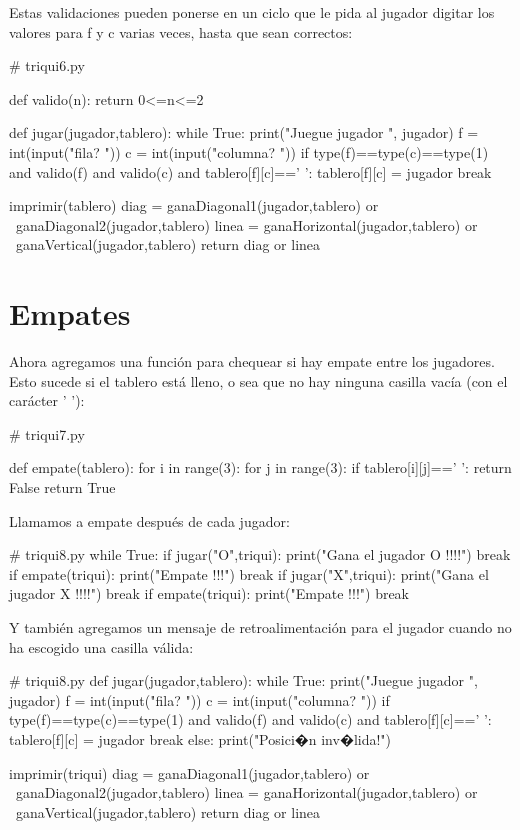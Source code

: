 Estas validaciones pueden ponerse en un ciclo que le pida al jugador
digitar los valores para f y c varias veces, hasta que sean correctos:

\begin{pythoncode}
# triqui6.py

def valido(n):
    return 0<=n<=2
    
def jugar(jugador,tablero):
    while True:     
        print("Juegue jugador ", jugador)
        f = int(input("fila? "))
        c = int(input("columna? "))
        if type(f)==type(c)==type(1) and valido(f) 
           and valido(c) and tablero[f][c]==' ':
            tablero[f][c] = jugador
            break      

    imprimir(tablero)
    diag = ganaDiagonal1(jugador,tablero) or \
           ganaDiagonal2(jugador,tablero)
    linea = ganaHorizontal(jugador,tablero) or \
            ganaVertical(jugador,tablero)
    return  diag or linea
\end{pythoncode}

\section{Empates}

Ahora agregamos una función para chequear si hay empate entre los
jugadores. Esto sucede si el tablero está lleno, o sea que no hay
ninguna casilla vacía (con el carácter ' '):

\begin{pythoncode}
# triqui7.py

def empate(tablero):
    for i in range(3):
        for j in range(3):
            if tablero[i][j]==' ':
                return False
    return True
\end{pythoncode}

Llamamos a empate después de cada jugador: 

\begin{pythoncode}
# triqui8.py
while True:
    if jugar("O",triqui):
        print("Gana el jugador O !!!!")
        break
    if empate(triqui):
        print("Empate !!!")
        break
    if jugar("X",triqui):
        print("Gana el jugador X !!!!")
        break
    if empate(triqui):
        print("Empate !!!")
        break
\end{pythoncode}

Y también agregamos un mensaje de retroalimentación para el jugador
cuando no ha escogido una casilla válida:

\begin{pythoncode}
# triqui8.py
def jugar(jugador,tablero):
    while True:     
        print("Juegue jugador ", jugador)
        f = int(input("fila? "))
        c = int(input("columna? "))
        if type(f)==type(c)==type(1) and valido(f) 
           and valido(c) and tablero[f][c]==' ':
            tablero[f][c] = jugador
            break
        else:
            print("Posici�n inv�lida!")

    imprimir(triqui)
    diag = ganaDiagonal1(jugador,tablero) or \
           ganaDiagonal2(jugador,tablero)
    linea = ganaHorizontal(jugador,tablero) or \
            ganaVertical(jugador,tablero)
    return  diag or linea
\end{pythoncode}

